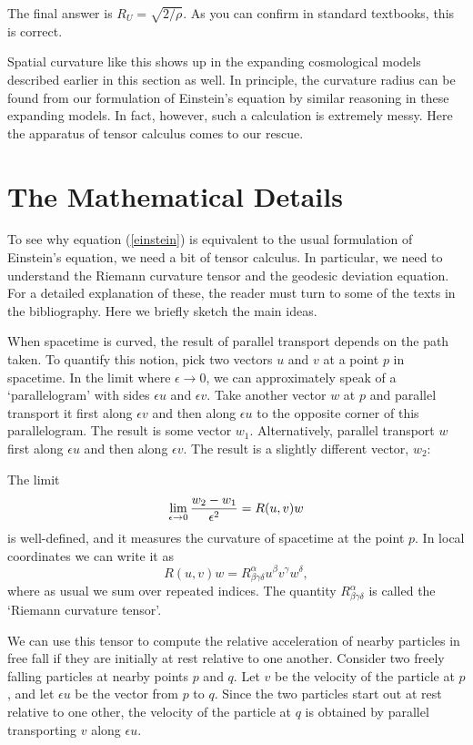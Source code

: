 The final answer is $R_U = \sqrt{2/\rho}$.  As you can confirm in standard
textbooks, this is correct.

Spatial curvature like this shows up in the expanding cosmological
models described earlier in this section as well.  In principle,
the curvature radius can be found from our formulation of Einstein's
equation by similar reasoning in these expanding models.  In fact,
however, such a calculation is extremely messy.  Here the apparatus of
tensor calculus comes to our rescue.  

\section{The Mathematical Details}

To see why equation (\ref{einstein}) is equivalent to the usual
formulation of Einstein's equation, we need a bit of tensor calculus.
In particular, we need to understand the Riemann curvature tensor
and the geodesic deviation equation.  For a detailed explanation
of these, the reader must turn to some of the texts in the bibliography.
Here we briefly sketch the main ideas.

When spacetime is curved, the result of parallel transport depends on
the path taken.  To quantify this notion, pick two vectors $u$ and $v$
at a point $p$ in spacetime.  In the limit where $\epsilon \to 0$, we
can approximately speak of a `parallelogram' with sides $\epsilon u$ and
$\epsilon v$.  Take another vector $w$ at $p$ and parallel transport it
first along $\epsilon v$ and then along $\epsilon u$ to the opposite
corner of this parallelogram.  The result is some vector $w_1$.
Alternatively, parallel transport $w$ first along $\epsilon u$ and then
along $\epsilon v$.  The result is a slightly different vector, $w_2$:

\medskip
\centerline{\epsfysize=1.8in} \medskip

\noindent 
The limit 
\begin{equation}
   \lim_{\epsilon \to 0} {w_2 - w_1 \over \epsilon^2} = R(u,v)w 
\label{riemann} \end{equation}
is well-defined, and it measures the curvature of spacetime at the point
$p$. In local coordinates we can write it as
\[    R(u,v)w = R^\alpha_{\beta\gamma\delta} u^\beta v^\gamma w^\delta,\]
where as usual we sum over repeated indices.  The quantity 
$R^\alpha_{\beta\gamma\delta}$ is called the `Riemann curvature
tensor'.  

We can use this tensor to compute the relative acceleration
of nearby particles in free fall if they are initially at rest
relative to one another.  Consider
two freely falling particles at nearby points $p$ and $q$.  Let $v$ be
the velocity of the particle at $p$, and let $\epsilon u$ be the vector
from $p$ to $q$.  Since the two particles start out at rest relative
to one other, the velocity of the particle at $q$ is obtained by 
parallel transporting $v$ along $\epsilon u$.

